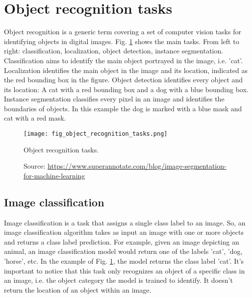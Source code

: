 \section{Object recognition tasks}
Object recognition is a generic term covering a set of computer vision tasks for identifying objects in digital images. Fig. \ref{fig:object_recognition_tasks} shows the main tasks. From left to right: classification, localization, object detection, instance segmentation. Classification aims to identify the main object portrayed in the image, i.e. 'cat'. Localization identifies the main object in the image and its location, indicated as the red bounding box in the figure. Object detection identifies every object and its location: A cat with a red bounding box and a dog with a blue bounding box. Instance segmentation classifies every pixel in an image and identifies the boundaries of objects. In this example the dog is marked with a blue mask and cat with a red mask.
\begin{figure}[ht]
    \begin{center}
    \texttt{[image: fig\_object\_recognition\_tasks.png]}
    \caption[Object recognition tasks]{
    Object recognition tasks.}
    \caption*{
    Source: \href{https://www.superannotate.com/blog/image-segmentation-for-machine-learning}{https://www.superannotate.com/blog/image-segmentation-for-machine-learning}}
    \label{fig:object_recognition_tasks}
    \end{center}
\end{figure}

\subsection{Image classification}
Image classification is a task that assigns a single class label to an image. So, an image classification algorithm takes as input an image with one or more objects and returns a class label prediction. For example, given an image depicting an animal, an image classification model would return one of the labels 'cat', 'dog, 'horse', etc. In the example of Fig. \ref{fig:object_recognition_tasks}, the model returns the class label 'cat'. It's important to notice that this task only recognizes an object of a specific class in an image, i.e. the object category the model is trained to identify. It doesn't return the location of an object within an image.

